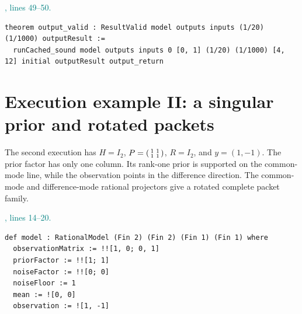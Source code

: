 \documentclass[11pt]{article}\usepackage{needspace}\renewcommand{\paperkind}{Lean companion}\setlength{\parskip}{0.35em}
\begin{document}


{\small\textcolor{teal}{, lines 49--50.}\par}

\begin{lstlisting}[style=BayesSource]
theorem output_valid : ResultValid model outputs inputs (1/20) (1/1000) outputResult :=
  runCached_sound model outputs inputs 0 [0, 1] (1/20) (1/1000) [4, 12] initial outputResult output_return
\end{lstlisting}

\section{Execution example II: a singular prior and rotated packets}

The second execution has $H=I_2$, $P=\begin{psmallmatrix}1&1\\1&1\end{psmallmatrix}$, $R=I_2$, and $y=(1,-1)$. The prior factor has only one column. Its rank-one prior is supported on the common-mode line, while the observation points in the difference direction. The common-mode and difference-mode rational projectors give a rotated complete packet family.



{\small\textcolor{teal}{, lines 14--20.}\par}

\begin{lstlisting}[style=BayesSource]
def model : RationalModel (Fin 2) (Fin 2) (Fin 1) (Fin 1) where
  observationMatrix := !![1, 0; 0, 1]
  priorFactor := !![1; 1]
  noiseFactor := !![0; 0]
  noiseFloor := 1
  mean := ![0, 0]
  observation := ![1, -1]
\end{lstlisting}

\end{document}

